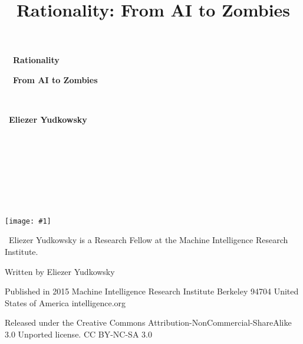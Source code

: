 \documentclass[letterpaper]{book}
\title{Rationality: From AI to Zombies}
\author{}
\date{}
\newcommand{\mygraphics}[1]{
  \texttt{[image: \#1]}
}
\begin{document}
{
  }


\bigskip

\clearpage
\bigskip

{\centering
\ \ \textbf{Rationality}
\par}


\bigskip

{\centering
\ \ \textbf{From AI to Zombies}
\par}

{\centering
 ~
\par}

{\centering
\ \textbf{Eliezer Yudkowsky}
\par}

\paragraph[]{\rmfamily }
{\centering
 ~
\par}

{\centering
 ~
\par}

{\centering
 ~
\par}

{\centering
 ~
\par}

\mygraphics{Rationality20From20AI20to20Zombies2020Eliezer20Yudkowsky-img2.jpg}


\bigskip

{\centering
 \ Eliezer Yudkowsky is a Research Fellow at the Machine
Intelligence Research Institute.
\par}


\bigskip

{\centering
 Written by Eliezer Yudkowsky
\par}


\bigskip

{\centering
 Published in 2015\newline
 Machine Intelligence Research Institute\newline
 Berkeley 94704\newline
 United States of America\newline
 intelligence.org\newline

\par}

{\centering
 Released under the Creative Commons
Attribution-NonCommercial-ShareAlike 3.0 Unported license.\newline
 CC BY-NC-SA 3.0
\par}
\end{document}
